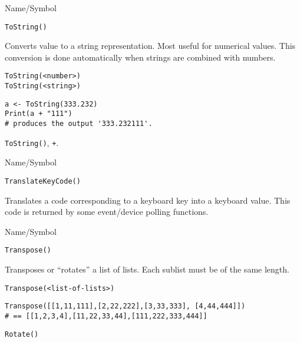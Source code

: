 \rl


\begin{desc}{Name/Symbol}
\item[Name/Symbol]  	\verb+ToString()+

\item[Description] Converts value to a string representation. Most
  useful for numerical values.  This conversion is done automatically
  when strings are combined with numbers.

\item[Usage]     
\begin{verbatim}
ToString(<number>)
ToString(<string>)
\end{verbatim}

\item[Example]
\begin{verbatim}
a <- ToString(333.232)
Print(a + "111")
# produces the output '333.232111'.
\end{verbatim}
		

\item[See Also] \verb+ToString()+, \verb|+|.
\end{desc}

\rl


\begin{desc}{Name/Symbol}
\item[Name/Symbol]  	\verb+TranslateKeyCode()+

\item[Description] Translates a code corresponding to a keyboard key
  into a keyboard value.  This code is returned by some event/device
  polling functions.

\item[Usage]		

\item[Example]	

\item[See Also]	
\end{desc}

\rl


\begin{desc}{Name/Symbol}
\item[Name/Symbol]  	\verb+Transpose()+

\item[Description] Transposes or ``rotates'' a list of lists.  Each
  sublist must be of the same length.

\item[Usage]       	
\begin{verbatim}
Transpose(<list-of-lists>)
\end{verbatim}

\item[Example]     	
\begin{verbatim}
Transpose([[1,11,111],[2,22,222],[3,33,333], [4,44,444]])
# == [[1,2,3,4],[11,22,33,44],[111,222,333,444]]
\end{verbatim}

\item[See Also]    	\verb+Rotate()+
\end{desc}

